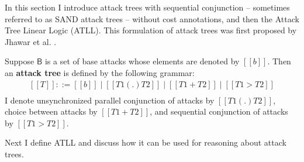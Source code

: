 
In this section I introduce attack trees with sequential conjunction
-- sometimes referred to as SAND attack trees -- without cost
annotations, and then the Attack Tree Linear Logic (ATLL).  This
formulation of attack trees was first proposed by Jhawar et
al. \cite{Jhawar:2015}.
\begin{definition}
  \label{def:atrees}
  Suppose $\mathsf{B}$ is a set of base attacks whose elements are
  denoted by $[[b]]$.  Then an \textbf{attack tree} is defined by
  the following grammar:
  \[
  \begin{array}{lll}
    [[T]] ::= [[b]] \mid [[T1 (.) T2]] \mid [[T1 + T2]] \mid [[T1 > T2]]\\
  \end{array}
  \]
  I denote unsynchronized parallel conjunction of attacks by $[[T1 (.) T2]]$,
  choice between attacks by $[[T1 + T2]]$, and sequential
  conjunction of attacks by $[[T1 > T2]]$.  
\end{definition}
Next I define ATLL and discuss how it can be used for reasoning about
attack trees.

